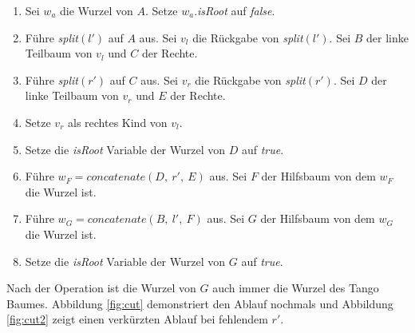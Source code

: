 \documentclass[a4paper,12pt]{article}
\begin{document}
\begin{enumerate}
	\item Sei $w_a$ die Wurzel von $A$. Setze $w_a$.\textit{isRoot} auf \textit{false}. 
	\item Führe \textit{split}$\left(l'\right)$ auf $A$ aus. Sei $v_l$ die Rückgabe von \textit{split}$\left(l'\right)$. Sei $B$ der linke Teilbaum von $v_l$ und $C$ der Rechte. 
	\item Führe \textit{split}$\left(r'\right)$ auf $C$ aus. Sei $v_r$ die Rückgabe von \textit{split}$\left(r'\right)$. Sei $D$ der linke Teilbaum von $v_r$ und $E$ der Rechte. 
	\item Setze $v_r$ als rechtes Kind von $v_l$. 
	\item Setze die \textit{isRoot} Variable der Wurzel von $D$ auf \textit{true}.
	\item Führe $w_F = \textit{concatenate}\left(D, ~ r', ~ E \right)$ aus. Sei $F$ der Hilfsbaum von dem $w_F$ die Wurzel ist.
	\item Führe $w_G = \textit{concatenate}\left(B, ~ l',~ F \right)$ aus. Sei $G$ der Hilfsbaum von dem  $w_G$ die Wurzel ist.
	\item Setze die \textit{isRoot} Variable der Wurzel von $G$ auf \textit{true}.
\end{enumerate}
Nach der Operation ist die Wurzel von $G$ auch immer die Wurzel des Tango Baumes. Abbildung \ref{fig:cut} demonstriert den Ablauf nochmals und Abbildung \ref{fig:cut2} zeigt einen verkürzten Ablauf bei fehlendem $r'$.
\end{document}
